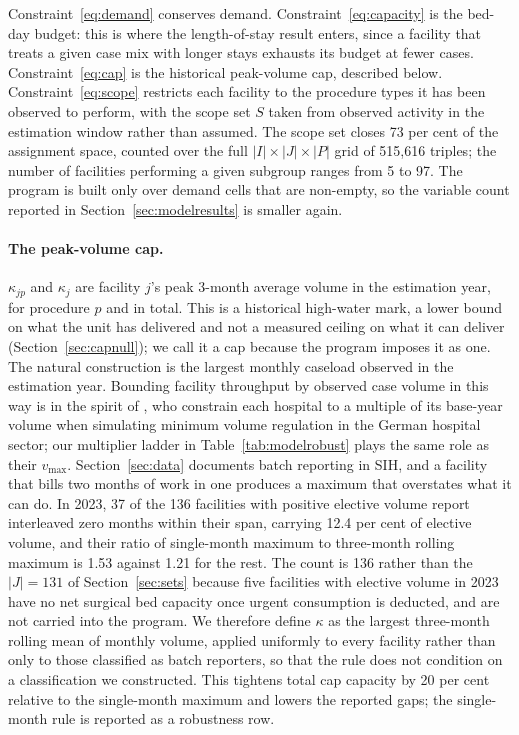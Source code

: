 Constraint~\eqref{eq:demand} conserves demand. Constraint~\eqref{eq:capacity} is
the bed-day budget: this is where the length-of-stay result enters, since a
facility that treats a given case mix with longer stays exhausts its budget at
fewer cases. Constraint~\eqref{eq:cap} is the historical peak-volume cap,
described below. Constraint~\eqref{eq:scope} restricts each facility to the
procedure types it has been observed to perform, with the scope set $S$ taken
from observed activity in the estimation window rather than assumed. The scope
set closes 73 per cent of the assignment space, counted over the full
$|I| \times |J| \times |P|$ grid of 515{,}616 triples; the number of facilities
performing a given subgroup ranges from 5 to 97. The program is built only over
demand cells that are non-empty, so the variable count reported in
Section~\ref{sec:modelresults} is smaller again.

\paragraph{The peak-volume cap.} $\kappa_{jp}$ and $\kappa_{j}$ are facility $j$'s
peak 3-month average volume in the estimation year, for procedure $p$ and in total. This is
a historical high-water mark, a lower bound on what the unit has delivered and not a measured
ceiling on what it can deliver (Section~\ref{sec:capnull}); we call it a cap because the program
imposes it as one. The natural construction is the largest monthly caseload observed in the estimation year.
Bounding facility throughput by observed case volume in this way is in the spirit of
\citet{vogel2022}, who constrain each hospital to a multiple of its base-year
volume when simulating minimum volume regulation in the German hospital sector;
our multiplier ladder in Table~\ref{tab:modelrobust} plays the same role as
their $v_{\max}$. Section~\ref{sec:data} documents batch reporting in SIH, and a facility that
bills two months of work in one produces a maximum that overstates what it can
do. In 2023, 37 of the 136 facilities with positive elective volume report
interleaved zero months within their span, carrying 12.4 per cent of elective
volume, and their ratio of single-month maximum to three-month rolling maximum
is 1.53 against 1.21 for the rest. The count is 136 rather than the $|J| = 131$
of Section~\ref{sec:sets} because five facilities with elective volume in 2023
have no net surgical bed capacity once urgent consumption is deducted, and are
not carried into the program. We therefore define $\kappa$ as the largest
three-month rolling mean of monthly volume, applied uniformly to every facility
rather than only to those classified as batch reporters, so that the rule does
not condition on a classification we constructed. This tightens total cap
capacity by 20 per cent relative to the single-month maximum and lowers the
reported gaps; the single-month rule is reported as a robustness row.

